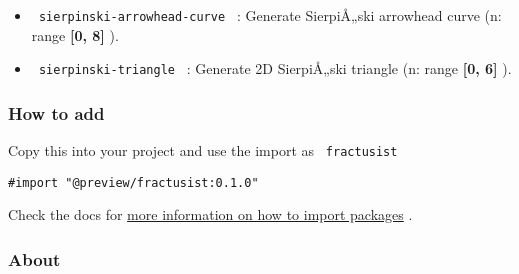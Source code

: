 \begin{itemize}
\tightlist
\item
  \texttt{\ sierpinski-arrowhead-curve\ } : Generate SierpiÅ„ski
  arrowhead curve (n: range \textbf{{[}0, 8{]}} ).
\end{itemize}

\begin{Shaded}
\begin{Highlighting}[]
\end{Highlighting}
\end{Shaded}

\begin{itemize}
\tightlist
\item
  \texttt{\ sierpinski-triangle\ } : Generate 2D SierpiÅ„ski triangle
  (n: range \textbf{{[}0, 6{]}} ).
\end{itemize}

\begin{Shaded}
\begin{Highlighting}[]
\end{Highlighting}
\end{Shaded}

\subsubsection{How to add}\label{how-to-add}

Copy this into your project and use the import as
\texttt{\ fractusist\ }

\begin{verbatim}
#import "@preview/fractusist:0.1.0"
\end{verbatim}



Check the docs for
\href{https://typst.app/docs/reference/scripting/\#packages}{more
information on how to import packages} .

\subsubsection{About}\label{about}

